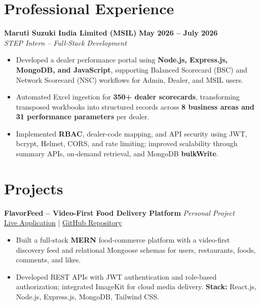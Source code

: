 \documentclass[a4paper,10pt]{article}
\newcommand{\resumeHeading}[4]{
  \textbf{#1} \hfill \textbf{#2}\\
  \textit{#3} \hfill \textit{#4}\\[-3pt]
}
\newcommand{\projectHeading}[3]{
  \textbf{#1} \hfill \textit{#2}\\
  #3\\[-3pt]
}
\begin{document}
\section{Professional Experience}

\resumeHeading
  {Maruti Suzuki India Limited (MSIL)}
  {May 2026 -- July 2026}
  {STEP Intern -- Full-Stack Development}
  {}

\begin{itemize}
  \item Developed a dealer performance portal using
  \textbf{Node.js, Express.js, MongoDB, and JavaScript}, supporting Balanced
  Scorecard (BSC) and Network Scorecard (NSC) workflows for Admin, Dealer,
  and MSIL users.

  \item Automated Excel ingestion for \textbf{350+ dealer scorecards},
  transforming transposed workbooks into structured records across
  \textbf{8 business areas and 31 performance parameters} per dealer.

  \item Implemented \textbf{RBAC}, dealer-code mapping, and API security using
  JWT, bcrypt, Helmet, CORS, and rate limiting; improved scalability through
  summary APIs, on-demand retrieval, and MongoDB \textbf{bulkWrite}.
\end{itemize}


\section{Projects}

\projectHeading
  {FlavorFeed -- Video-First Food Delivery Platform}
  {Personal Project}
  {\href{https://flavour-feed-latest.vercel.app/}{Live Application}
  \;|\;
  \href{https://github.com/ayushsotechy/ZomatoClone.git}{GitHub Repository}}

\begin{itemize}
  \item Built a full-stack \textbf{MERN} food-commerce platform with a
  video-first discovery feed and relational Mongoose schemas for users,
  restaurants, foods, comments, and likes.

  \item Developed REST APIs with JWT authentication and role-based
  authorization; integrated ImageKit for cloud media delivery.
  \textbf{Stack:} React.js, Node.js, Express.js, MongoDB, Tailwind CSS.
\end{itemize}
\end{document}
